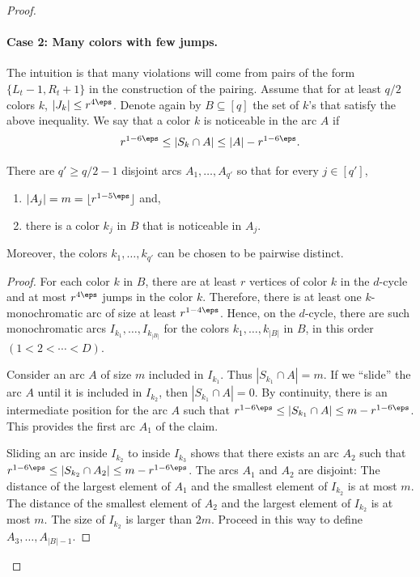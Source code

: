 \documentclass{article}
\begin{document}
\begin{proof}
\paragraph{Case 2: Many colors with few jumps.}
The intuition is that many violations will come
from pairs of the form $\{L_t - 1, R_t + 1\}$ in the construction of the pairing.
Assume that for at least $q/2$ colors $k$,
$|J_k| \leq r^{4\eps}$.
Denote again by $B \subseteq [q]$ the set of $k$’s that satisfy the above inequality. We say that a color $k$ is
noticeable in the arc $A$ if
\[
r^{1 - 6\eps} \leq |S_{k}\cap A| \leq 
|A| - r^{1-6\eps}.
\]

\begin{claim}\label{clm:noticeable}
There are $q' \geq q/2 - 1$ disjoint arcs $A_1,\ldots, A_{q'}$ so that for every $j \in [q'
]$,
\begin{enumerate}
    \item $|A_j | = m = \lfloor r^{1-5\eps}\rfloor$ and,
\item there is a color $k_j$ in $B$ that is noticeable in $A_j$.
\end{enumerate}
Moreover, the colors $k_1,\ldots, k_{q'}$ can be chosen to be pairwise distinct.
\end{claim}

\begin{proof}
For each color $k$ in $B$, there are at least $r$ vertices of color $k$ in the $d$-cycle and at most
$r^{4\eps}$ jumps in the color $k$. Therefore, there is at least one $k$-monochromatic arc of size at least
$r^{1-4\eps}$. Hence, on the $d$-cycle, there are such monochromatic arcs $I_{k_1}
,\ldots, I_{k_{|B|}}$
for the colors
$k_1,\ldots, k_{|B|}$
in $B$, in this order $(1 < 2 <\cdots< D)$.

Consider an arc $A$ of size $m$ included in $I_{k_1}$. Thus $|S_{k_1} \cap A| = m$. If we “slide” the arc $A$ until
it is included in $I_{k_2}$, then $|S_{k_1} \cap A| = 0$. By continuity, there is an intermediate position for the arc
$A$ such that $r^{1-6\eps} \leq |S_{k_1} \cap A| \leq m - r^{1-6\eps}$. This provides the first arc $A_1$ of the claim.

Sliding an arc inside $I_{k_2}$
to inside $I_{k_3}$
shows that there exists an arc $A_2$ such that $r^{1-6\eps}\leq
|S_{k_2} \cap A_2| \leq m - r^{1-6\eps}$. The arcs $A_1$ and $A_2$ are disjoint: The distance of the largest element of $A_1$
and the smallest element of $I_{k_2}$
is at most $m$. The distance of the smallest element of $A_2$ and the
largest element of $I_{k_2}$
is at most $m$. The size of $I_{k_2}$
is larger than $2m$.
Proceed in this way to define $A_3,\ldots, A_{|B|-1}$.
\end{proof}


\end{proof}
\end{document}

